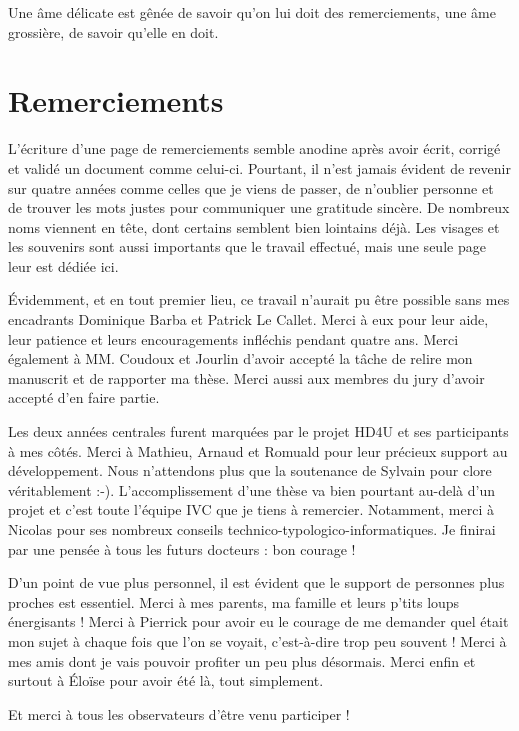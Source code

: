 \begin{savequote}[12pc]
Une âme délicate est gênée de savoir qu'on lui doit des remerciements, une âme grossière, de savoir qu'elle en doit.
\end{savequote}
\chapter*{Remerciements}
L'écriture d'une page de remerciements semble anodine après avoir écrit, corrigé et validé un document comme celui-ci. Pourtant, il n'est jamais évident de revenir sur quatre années comme celles que je viens de passer, de n'oublier personne et de trouver les mots justes pour communiquer une gratitude sincère. De nombreux noms viennent en tête, dont certains semblent bien lointains déjà. Les visages et les souvenirs sont aussi importants que le travail effectué, mais une seule page leur est dédiée ici.

\bigskip

Évidemment, et en tout premier lieu, ce travail n'aurait pu être possible sans mes encadrants Dominique Barba et Patrick Le Callet. Merci à eux pour leur aide, leur patience et leurs encouragements infléchis pendant quatre ans. Merci également à MM. Coudoux et Jourlin d'avoir accepté la tâche de relire mon manuscrit et de rapporter ma thèse. Merci aussi aux membres du jury d'avoir accepté d'en faire partie.

\bigskip

Les deux années centrales furent marquées par le projet HD4U et ses participants à mes côtés. Merci à Mathieu, Arnaud et Romuald pour leur précieux support au développement. Nous n'attendons plus que la soutenance de Sylvain pour clore véritablement :-). L'accomplissement d'une thèse va bien pourtant au-delà d'un projet et c'est toute l'équipe IVC que je tiens à remercier. Notamment, merci à Nicolas pour ses nombreux conseils technico-typologico-informatiques. Je finirai par une pensée à tous les futurs docteurs : bon courage !

\bigskip

D'un point de vue plus personnel, il est évident que le support de personnes plus proches est essentiel. Merci à mes parents, ma famille et leurs p'tits loups énergisants ! Merci à Pierrick pour avoir eu le courage de me demander quel était mon sujet à chaque fois que l'on se voyait, c'est-à-dire trop peu souvent ! Merci à mes amis dont je vais pouvoir profiter un peu plus désormais. Merci enfin et surtout à Éloïse pour avoir été là, tout simplement.

\bigskip

Et merci à tous les observateurs d'être venu participer !
